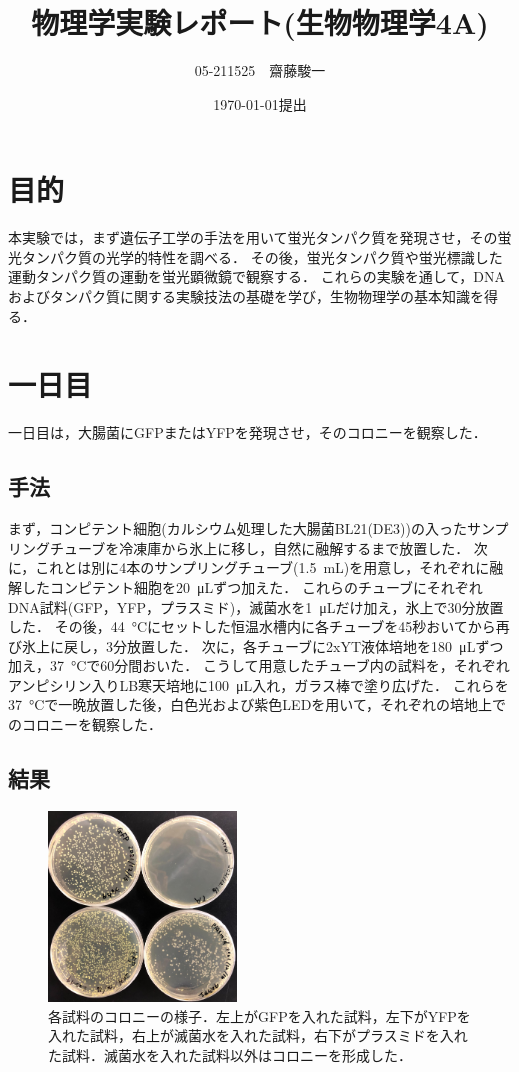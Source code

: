 \documentclass[a4paper,11pt, titlepage]{jsarticle}
\begin{document}
\title{物理学実験レポート(生物物理学4A)}
\author{05-211525　齋藤駿一}
\date{\today 提出}
\maketitle

\section{目的}
本実験では，まず遺伝子工学の手法を用いて蛍光タンパク質を発現させ，その蛍光タンパク質の光学的特性を調べる．
その後，蛍光タンパク質や蛍光標識した運動タンパク質の運動を蛍光顕微鏡で観察する．
これらの実験を通して，DNAおよびタンパク質に関する実験技法の基礎を学び，生物物理学の基本知識を得る．

\section{一日目}
一日目は，大腸菌にGFPまたはYFPを発現させ，そのコロニーを観察した．

\subsection{手法}
まず，コンピテント細胞(カルシウム処理した大腸菌BL21(DE3))の入ったサンプリングチューブを冷凍庫から氷上に移し，自然に融解するまで放置した．
次に，これとは別に4本のサンプリングチューブ(\SI{1.5}{\milli\liter})を用意し，それぞれに融解したコンピテント細胞を\SI{20}{\micro\liter}ずつ加えた．
これらのチューブにそれぞれDNA試料(GFP，YFP，プラスミド)，滅菌水を\SI{1}{\micro\liter}だけ加え，氷上で30分放置した．
その後，\SI{44}{\degreeCelsius}にセットした恒温水槽内に各チューブを45秒おいてから再び氷上に戻し，3分放置した．
次に，各チューブに2xYT液体培地を\SI{180}{\micro\liter}ずつ加え，\SI{37}{\degreeCelsius}で60分間おいた．
こうして用意したチューブ内の試料を，それぞれアンピシリン入りLB寒天培地に\SI{100}{\micro\liter}入れ，ガラス棒で塗り広げた．
これらを\SI{37}{\degreeCelsius}で一晩放置した後，白色光および紫色LEDを用いて，それぞれの培地上でのコロニーを観察した．

\subsection{結果}

\begin{figure}[htbp]
    \centering
    \includegraphics[width=5cm]{colonies.jpg}
    \caption{各試料のコロニーの様子．左上がGFPを入れた試料，左下がYFPを入れた試料，右上が滅菌水を入れた試料，右下がプラスミドを入れた試料．滅菌水を入れた試料以外はコロニーを形成した．}
    \label{fig:colonies}
\end{figure}
\end{document}
